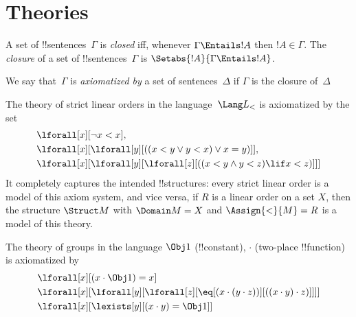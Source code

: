 






\section{Theories}

\begin{defn}
A set of !!{sentence}s~$\Gamma$ is \emph{closed} iff, whenever
$\Gamma \Entails !A$ then $!A \in \Gamma$.  The \emph{closure} of a set
of !!{sentence}s~$\Gamma$ is $\Setabs{!A}{\Gamma \Entails !A}$.

We say that~$\Gamma$ is \emph{axiomatized by} a set of
sentences~$\Delta$ if $\Gamma$ is the closure of~$\Delta$
\end{defn}

\begin{ex}
The theory of strict linear orders in the language~$\Lang L_<$ is
axiomatized by the set
\begin{align*}
& \lforall[x][\lnot x < x], \\
& \lforall[x][\lforall[y][((x < y \lor y <
    x) \lor x = y)]], \\
& \lforall[x][\lforall[y][\lforall[z][((x < y
      \land y < z) \lif x < z)]]]
\end{align*}
It completely captures the intended !!{structure}s: every strict
linear order is a model of this axiom system, and vice versa, if $R$
is a linear order on a set $X$, then the structure $\Struct M$ with
$\Domain M = X$ and $\Assign{<}{M} = R$ is a model of this theory.
\end{ex}

\begin{ex}
The theory of groups in the language $\Obj 1$ (!!{constant}), $\cdot$
(two-place !!{function}) is axiomatized by
\begin{align*}
& \lforall[x][(x \cdot \Obj 1) = x]\\
& \lforall[x][\lforall[y][\lforall[z][\eq[(x \cdot (y \cdot z))][((x
          \cdot y) \cdot z)]]]]\\
& \lforall[x][\lexists[y][(x \cdot y) = \Obj 1]]
\end{align*}
\end{ex}


